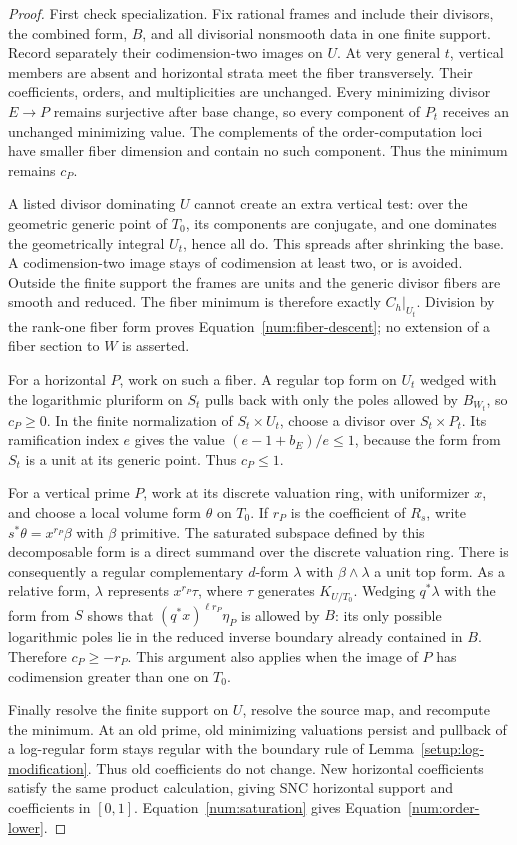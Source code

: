 \begin{proof}
First check specialization.  Fix rational frames and include their
divisors, the combined form, $B$, and all divisorial nonsmooth data in
one finite support.  Record separately their codimension-two images
on $U$.  At very general $t$, vertical members are absent and
horizontal strata meet the fiber transversely.  Their coefficients,
orders, and multiplicities are unchanged.  Every minimizing divisor
$E\to P$ remains surjective after base change, so every component of
$P_t$ receives an unchanged minimizing value.  The complements of the
order-computation loci have smaller fiber dimension and contain no
such component.  Thus the minimum remains $c_P$.

A listed divisor dominating $U$ cannot create an extra vertical test:
over the geometric generic point of $T_0$, its components are
conjugate, and one dominates the geometrically integral $U_t$, hence
all do.  This spreads after shrinking the base.  A codimension-two
image stays of codimension at least two, or is avoided.  Outside the
finite support the frames are units and the generic divisor fibers
are smooth and reduced.  The fiber minimum is therefore exactly
$C_h|_{U_t}$.  Division by the rank-one fiber form proves
Equation~\eqref{num:fiber-descent}; no extension of a fiber section
to $W$ is asserted.

For a horizontal $P$, work on such a fiber.  A regular top form on
$U_t$ wedged with the logarithmic pluriform on $S_t$ pulls back
with only the poles allowed by $B_{W_t}$,
so $c_P\geq0$.  In the finite normalization of $S_t\times U_t$,
choose a divisor over $S_t\times P_t$.  Its ramification index $e$
gives the value $(e-1+b_E)/e\leq1$, because the form from $S_t$ is
a unit at its generic point.  Thus $c_P\leq1$.

For a vertical prime $P$, work at its discrete valuation ring, with
uniformizer $x$, and choose a local volume form $\theta$ on $T_0$.
If $r_P$ is the coefficient of $R_s$, write
$s^*\theta=x^{r_P}\beta$ with $\beta$ primitive.  The saturated
subspace defined by this decomposable form is a direct summand over
the discrete valuation ring.  There is consequently a regular
complementary $d$-form $\lambda$ with $\beta\wedge\lambda$ a unit
top form.  As a relative form, $\lambda$ represents $x^{r_P}\tau$,
where $\tau$ generates $K_{U/T_0}$.  Wedging $q^*\lambda$ with the
form from $S$ shows that $(q^*x)^{\ell r_P}\eta_P$ is allowed by
$B$: its only possible logarithmic poles lie in the reduced inverse
boundary already contained in $B$. Therefore $c_P\geq-r_P$. This argument also applies when the
image of $P$ has codimension greater than one on $T_0$.

Finally resolve the finite support on $U$, resolve the source map,
and recompute the minimum.  At an old prime, old minimizing
valuations persist and pullback of a log-regular form stays regular
with the boundary rule of Lemma~\ref{setup:log-modification}.
Thus old coefficients do not change.  New horizontal coefficients
satisfy the same product calculation, giving SNC horizontal support
and coefficients in $[0,1]$.  Equation~\eqref{num:saturation} gives
Equation~\eqref{num:order-lower}.
\end{proof}

